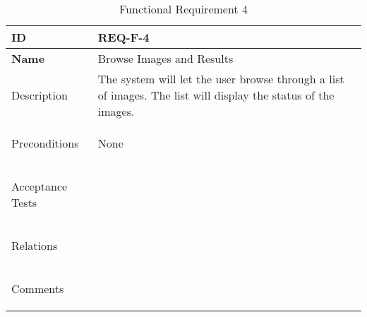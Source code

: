 \begin{table}[H]
    \begin{tabular}[t]{ | >{\bfseries}l | p{9.5cm} |}

    \hline
    ID
    &  REQ-F-4 \\ \hline

    Name
    & Browse Images and Results \\ \hline

    Description
    &  The system will let the user browse through a list of images. The list will display the status of the images. \\ \hline

    Preconditions
    & None \\ \hline

    Acceptance Tests
    & \\ \hline

    Relations
    &  \\ \hline

    Comments
    &  \\ \hline

    \end{tabular}

    \caption{Functional Requirement 4}
    \label{fig:req_f_4}

\end{table}